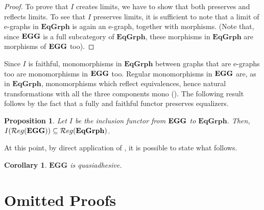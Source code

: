 \documentclass[a4paper, twoside,openright]{report}
\theoremstyle{plain}
\newtheorem{prop}[theorem]{Proposition}
\newtheorem{cor}[theorem]{Corollary}
\theoremstyle{definition}
\begin{document}
\begin{proof}
    To prove that $I$ creates limits, we have to show that both preserves and reflects limits.
    To see that $I$ preserves limits, it is sufficient to note that a limit of e-graphs in $\mathbf{EqGrph}$ is again an e-graph, together with morphisms. (Note that, since $\mathbf{EGG}$ is a full subcategory of $\mathbf{EqGrph}$, these morphisms in $\mathbf{EqGrph}$ are morphisms of $\mathbf{EGG}$ too).
\end{proof}

Since $I$ is faithful, monomorphisms in $\mathbf{EqGrph}$ between graphs that are e-graphs too are monomorphisms in $\mathbf{EGG}$ too. Regular monomorphisms in $\mathbf{EGG}$ are, as in $\mathbf{EqGrph}$, monomorphisms which reflect equivalences, hence natural transformations with all the three components mono (). The following result follows by the fact that a fully and faithful functor preserves equalizers. {\color{red}{???? Da dimostrare}}

\begin{prop}
    Let $I$ be the inclusion functor from $\mathbf{EGG}$ to $\mathbf{EqGrph}$. Then, $I(\mathcal{R}eg(\mathbf{EGG})) \subseteq \mathcal{R}eg(\mathbf{EqGrph})$.
\end{prop}

At this point, by direct application of , it is possible to state what follows.

\begin{cor}
    $\mathbf{EGG}$ is quasiadhesive.
\end{cor}


\appendix


\chapter{Omitted Proofs}
\end{document}
